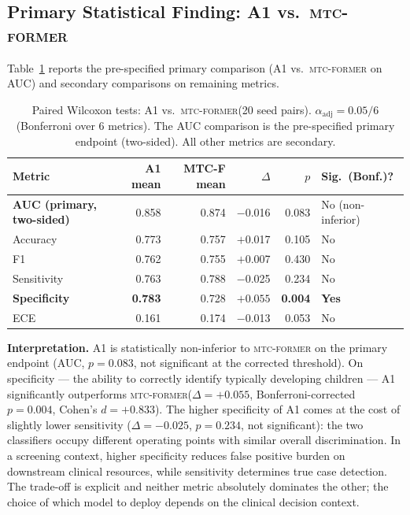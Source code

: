\documentclass[a4paper,fleqn]{cas-sc}
\newcommand{\mtcf}{\textsc{mtc-former}\xspace}
\begin{document}
\subsection{Primary Statistical Finding: A1 vs.\ \mtcf}
\label{sec:results_primary}

Table~\ref{tab:primary_stats} reports the pre-specified primary comparison
(A1 vs.\ \mtcf on AUC) and secondary comparisons on remaining metrics.

\begin{table}[h!]
  \centering
  \caption{%
    Paired Wilcoxon tests: A1 vs.\ \mtcf (20 seed pairs).
    $\alpha_{\text{adj}} = 0.05/6$ (Bonferroni over 6 metrics).
    The AUC comparison is the pre-specified primary endpoint (two-sided).
    All other metrics are secondary.}
  \label{tab:primary_stats}
  \small
  \begin{tabularx}{\linewidth}{@{}l r r r r l@{}}
    \toprule
    Metric & A1 mean & MTC-F mean & $\Delta$ & $p$ & Sig.\ (Bonf.)? \\
    \midrule
    \textbf{AUC (primary, two-sided)} & 0.858 & 0.874 & $-$0.016 & 0.083 & No (non-inferior) \\
    Accuracy       & 0.773 & 0.757 & $+$0.017 & 0.105 & No \\
    F1             & 0.762 & 0.755 & $+$0.007 & 0.430 & No \\
    Sensitivity    & 0.763 & 0.788 & $-$0.025 & 0.234 & No \\
    \textbf{Specificity} & \textbf{0.783} & 0.728 & $\mathbf{+0.055}$ & \textbf{0.004} & \textbf{Yes} \\
    ECE            & 0.161 & 0.174 & $-$0.013 & 0.053 & No \\
    \bottomrule
  \end{tabularx}
\end{table}

\textbf{Interpretation.}
A1 is statistically non-inferior to \mtcf on the primary endpoint (AUC,
$p=0.083$, not significant at the corrected threshold).
On specificity --- the ability to correctly identify typically developing
children --- A1 significantly outperforms \mtcf ($\Delta=+0.055$,
Bonferroni-corrected $p=0.004$, Cohen's $d=+0.833$).
The higher specificity of A1 comes at the cost of slightly lower sensitivity
($\Delta=-0.025$, $p=0.234$, not significant): the two classifiers occupy
different operating points with similar overall discrimination.
In a screening context, higher specificity reduces false positive burden on
downstream clinical resources, while sensitivity determines true case detection.
The trade-off is explicit and neither metric absolutely dominates the other;
the choice of which model to deploy depends on the clinical decision context.
\end{document}

